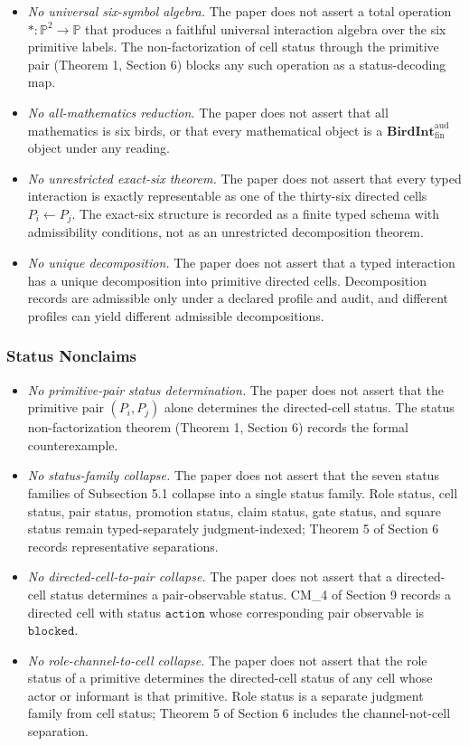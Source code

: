 \documentclass[11pt]{article}
\providecommand{\tightlist}{}
\theoremstyle{definition}
\begin{document}
\begin{itemize}
\tightlist
\item
  \emph{No universal six-symbol algebra.} The paper does not assert a total operation \(\ast:\mathbb P^{2}\to\mathbb P\) that produces a faithful universal interaction algebra over the six primitive labels. The non-factorization of cell status through the primitive pair (Theorem 1, Section 6) blocks any such operation as a status-decoding map.
\item
  \emph{No all-mathematics reduction.} The paper does not assert that all mathematics is six birds, or that every mathematical object is a \(\mathbf{BirdInt}^{\mathrm{aud}}_{\mathrm{fin}}\) object under any reading.
\item
  \emph{No unrestricted exact-six theorem.} The paper does not assert that every typed interaction is exactly representable as one of the thirty-six directed cells \(P_{i}\leftarrow P_{j}\). The exact-six structure is recorded as a finite typed schema with admissibility conditions, not as an unrestricted decomposition theorem.
\item
  \emph{No unique decomposition.} The paper does not assert that a typed interaction has a unique decomposition into primitive directed cells. Decomposition records are admissible only under a declared profile and audit, and different profiles can yield different admissible decompositions.
\end{itemize}

\subsubsection{Status Nonclaims}

\begin{itemize}
\tightlist
\item
  \emph{No primitive-pair status determination.} The paper does not assert that the primitive pair \((P_{i},P_{j})\) alone determines the directed-cell status. The status non-factorization theorem (Theorem 1, Section 6) records the formal counterexample.
\item
  \emph{No status-family collapse.} The paper does not assert that the seven status families of Subsection 5.1 collapse into a single status family. Role status, cell status, pair status, promotion status, claim status, gate status, and square status remain typed-separately judgment-indexed; Theorem 5 of Section 6 records representative separations.
\item
  \emph{No directed-cell-to-pair collapse.} The paper does not assert that a directed-cell status determines a pair-observable status. CM\_4 of Section 9 records a directed cell with status \(\texttt{action}\) whose corresponding pair observable is \(\texttt{blocked}\).
\item
  \emph{No role-channel-to-cell collapse.} The paper does not assert that the role status of a primitive determines the directed-cell status of any cell whose actor or informant is that primitive. Role status is a separate judgment family from cell status; Theorem 5 of Section 6 includes the channel-not-cell separation.
\end{itemize}
\end{document}
